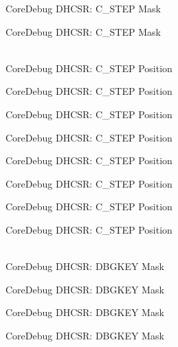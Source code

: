 \begin{DoxyRefList}
\label{deprecated__deprecated000487}%
%
Core\+Debug DHCSR:\+ C\+\_\+\+STEP Mask 

\label{deprecated__deprecated000589}%
%
Core\+Debug DHCSR:\+ C\+\_\+\+STEP Mask  
\item[{\parbox[t]{\linewidth}{Global \doxylink{group__CMSIS__CoreDebug_gae1fc39e80de54c0339cbb1b298a9f0f9}{Core\+Debug\+\_\+\+DHCSR\+\_\+\+C\+\_\+\+STEP\+\_\+\+Pos} }}]\hfill \\
\label{deprecated__deprecated000035}%
%
Core\+Debug DHCSR:\+ C\+\_\+\+STEP Position 

\label{deprecated__deprecated000123}%
%
Core\+Debug DHCSR:\+ C\+\_\+\+STEP Position 

\label{deprecated__deprecated000179}%
%
Core\+Debug DHCSR:\+ C\+\_\+\+STEP Position 

\label{deprecated__deprecated000262}%
%
Core\+Debug DHCSR:\+ C\+\_\+\+STEP Position 

\label{deprecated__deprecated000321}%
%
Core\+Debug DHCSR:\+ C\+\_\+\+STEP Position 

\label{deprecated__deprecated000397}%
%
Core\+Debug DHCSR:\+ C\+\_\+\+STEP Position 

\label{deprecated__deprecated000486}%
%
Core\+Debug DHCSR:\+ C\+\_\+\+STEP Position 

\label{deprecated__deprecated000588}%
%
Core\+Debug DHCSR:\+ C\+\_\+\+STEP Position  
\item[{\parbox[t]{\linewidth}{Global \doxylink{group__CMSIS__CoreDebug_ga1ce997cee15edaafe4aed77751816ffc}{Core\+Debug\+\_\+\+DHCSR\+\_\+\+DBGKEY\+\_\+\+Msk} }}]\hfill \\
\label{deprecated__deprecated000006}%
%
Core\+Debug DHCSR:\+ DBGKEY Mask 

\label{deprecated__deprecated000106}%
%
Core\+Debug DHCSR:\+ DBGKEY Mask 

\label{deprecated__deprecated000160}%
%
Core\+Debug DHCSR:\+ DBGKEY Mask 

\label{deprecated__deprecated000245}%
%
Core\+Debug DHCSR:\+ DBGKEY Mask 


\end{DoxyRefList}
